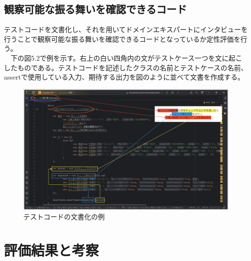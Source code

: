 \documentclass[12pt, a4paper]{jreport}
\begin{document}
\subsection{観察可能な振る舞いを確認できるコード}
テストコードを文書化し、それを用いてドメインエキスパートにインタビューを行うことで観察可能な振る舞いを確認できるコードとなっているか定性評価を行う。
\\　下の図5.2で例を示す。右上の白い四角内の文がテストケース一つを文に起こしたものである。テストコードを記述したクラスの名前とテストケースの名前、assertで使用している入力、期待する出力を図のように並べて文書を作成する。
\begin{figure}[H]
\centering
\includegraphics[width=1\linewidth]{image/testDoc.png}
\caption{テストコードの文書化の例}
\label{fig:enter-label}
\end{figure}
\section{評価結果と考察}
\end{document}

